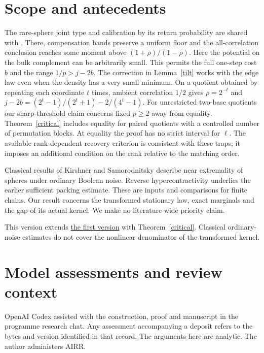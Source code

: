\documentclass[11pt]{article}
\begin{document}


\section{Scope and antecedents}
The rare-sphere joint type and calibration by its return probability are shared with \cite{shell}. There, compensation bands preserve a uniform floor and the all-correlation conclusion reaches some moment above $(1+\rho)/(1-\rho)$. Here the potential on the bulk complement can be arbitrarily small. This permits the full one-step cost $b$ and the range $1/p>j-2b$. The correction in Lemma~\ref{tilt} works with the edge law even when the density has a very small minimum. On a quotient obtained by repeating each coordinate $t$ times, ambient correlation $1/2$ gives $\rho=2^{-t}$ and $j-2b=(2^t-1)/(2^t+1)-2/(4^t-1)$. For unrestricted two-base quotients our sharp-threshold claim concerns fixed $p\ge2$ away from equality. Theorem~\ref{critical} includes equality for paired quotients with a controlled number of permutation blocks. At equality the proof has no strict interval for $\ell$. The available rank-dependent recovery criterion \cite{enumerator} is consistent with these traps; it imposes an additional condition on the rank relative to the matching order.

Classical results of Kirshner and Samorodnitsky \cite{ks} describe near extremality of spheres under ordinary Boolean noise. Reverse hypercontractivity \cite{mos} underlies the earlier sufficient packing estimate. These are inputs and comparisons for finite chains. Our result concerns the transformed stationary law, exact marginals and the gap of its actual kernel. We make no literature-wide priority claim.

This version extends \href{https://airr.science/papers/ARR-2026-54GRS2WX6182EVEB/versions/v1/}{the first version} with Theorem~\ref{critical}. Classical ordinary-noise estimates do not cover the nonlinear denominator of the transformed kernel.

\section*{Model assessments and review context}
OpenAI Codex assisted with the construction, proof and manuscript in the programme research chat. Any assessment accompanying a deposit refers to the bytes and version identified in that record. The arguments here are analytic. The author administers AIRR.
\end{document}
